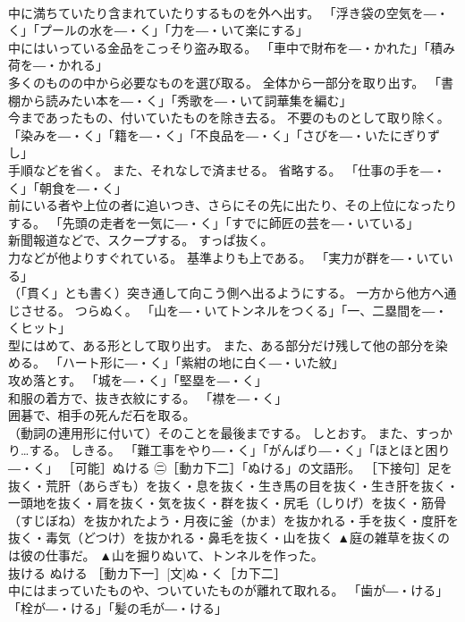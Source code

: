 \documentclass[8pt]{extreport}
\begin{document}
\begin{CJK}{UTF8}{min}
\\	中に満ちていたり含まれていたりするものを外へ出す。 「浮き袋の空気を―・く」「プールの水を―・く」「力を―・いて楽にする」 
\\	中にはいっている金品をこっそり盗み取る。 「車中で財布を―・かれた」「積み荷を―・かれる」 
\\	多くのものの中から必要なものを選び取る。 全体から一部分を取り出す。 「書棚から読みたい本を―・く」「秀歌を―・いて詞華集を編む」 
\\	今まであったもの、付いていたものを除き去る。 不要のものとして取り除く。 「染みを―・く」「籍を―・く」「不良品を―・く」「さびを―・いたにぎりずし」 
\\	手順などを省く。 また、それなしで済ませる。 省略する。 「仕事の手を―・く」「朝食を―・く」 
\\	前にいる者や上位の者に追いつき、さらにその先に出たり、その上位になったりする。 「先頭の走者を一気に―・く」「すでに師匠の芸を―・いている」 
\\	新聞報道などで、スクープする。 すっぱ抜く。 
\\	力などが他よりすぐれている。 基準よりも上である。 「実力が群を―・いている」 
\\	（「貫く」とも書く）突き通して向こう側へ出るようにする。 一方から他方へ通じさせる。 つらぬく。 「山を―・いてトンネルをつくる」「一、二塁間を―・くヒット」 
\\	型にはめて、ある形として取り出す。 また、ある部分だけ残して他の部分を染める。 「ハート形に―・く」「紫紺の地に白く―・いた紋」 
\\	攻め落とす。 「城を―・く」「堅塁を―・く」 
\\	和服の着方で、抜き衣紋にする。 「襟を―・く」 
\\	囲碁で、相手の死んだ石を取る。 
\\	（動詞の連用形に付いて）そのことを最後までする。 しとおす。 また、すっかり…する。 しきる。 「難工事をやり―・く」「がんばり―・く」「ほとほと困り―・く」 ［可能］ぬける ㊁［動カ下二］「ぬける」の文語形。 ［下接句］足を抜く・荒肝（あらぎも）を抜く・息を抜く・生き馬の目を抜く・生き肝を抜く・一頭地を抜く・肩を抜く・気を抜く・群を抜く・尻毛（しりげ）を抜く・筋骨（すじぼね）を抜かれたよう・月夜に釜（かま）を抜かれる・手を抜く・度肝を抜く・毒気（どつけ）を抜かれる・鼻毛を抜く・山を抜く	▲庭の雑草を抜くのは彼の仕事だ。 ▲山を掘りぬいて、トンネルを作った。
\\	抜ける	ぬける	［動カ下一］[文]ぬ・く［カ下二］ 
\\	中にはまっていたものや、ついていたものが離れて取れる。 「歯が―・ける」「栓が―・ける」「髪の毛が―・ける」 

\end{CJK}
\end{document}
